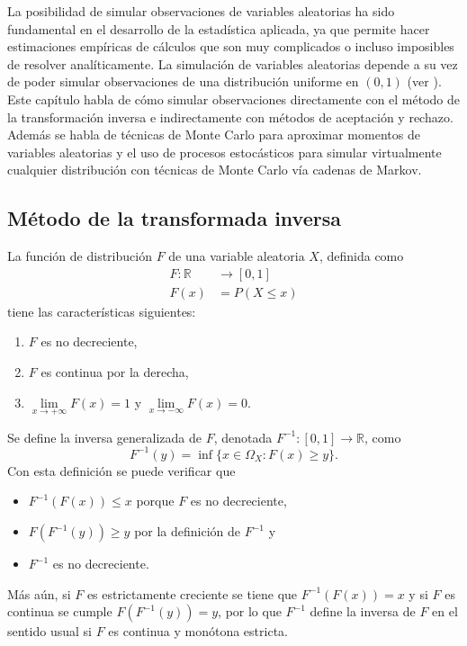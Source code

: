 \documentclass[11pt,a4paper]{article}
\begin{document}
La posibilidad de simular observaciones de variables aleatorias ha sido fundamental en el desarrollo de la estadística aplicada, ya que permite hacer estimaciones empíricas de cálculos que son muy complicados o incluso imposibles de resolver analíticamente. La simulación de variables aleatorias depende a su vez de poder simular observaciones de una distribución uniforme en $(0, 1)$ (ver \citet{dagpunar}). Este capítulo habla de cómo simular observaciones directamente con el método de la transformación inversa e indirectamente con métodos de aceptación y rechazo. Además se habla de técnicas de Monte Carlo para aproximar momentos de variables aleatorias y el uso de procesos estocásticos para simular virtualmente cualquier distribución con técnicas de Monte Carlo vía cadenas de Markov.

\subsection{Método de la transformada inversa}
\label{sec:transformada}

La función de distribución $F$ de una variable aleatoria $X$, definida como
\begin{align*}
F: \mathbb{R}&\to [0,1]\\
F(x) &= P\left(X \leq x\right)
\end{align*}
tiene las características siguientes:

\begin{enumerate}
\item $F$ es no decreciente,
\item $F$ es continua por la derecha,
\item $\lim\limits_{x\to +\infty}F(x) = 1$ y $\lim\limits_{x\to -\infty}F(x) = 0$.
\end{enumerate}
Se define la inversa generalizada de $F$, denotada $F^{-1}:[0,1]\to \mathbb{R}$, como $$F^{-1}(y) = \inf \{x\in \Omega_X: F(x) \geq y\}.$$ Con esta definición se puede verificar que
\begin{itemize}
\item $F^{-1}(F(x)) \leq x$ porque $F$ es no decreciente,
\item $F(F^{-1}(y)) \geq y$ por la definición de $F^{-1}$ y
\item $F^{-1}$ es no decreciente.
\end{itemize}
Más aún, si $F$ es estrictamente creciente se tiene que $F^{-1}(F(x)) = x$ y si $F$ es continua se cumple $F(F^{-1}(y)) = y$, por lo que $F^{-1}$ define la inversa de $F$ en el sentido usual si $F$ es continua y monótona estricta.
\end{document}
